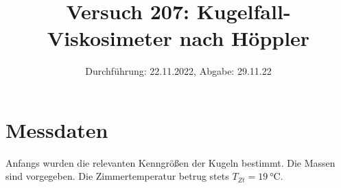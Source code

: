 

\title{Versuch 207: Kugelfall-Viskosimeter nach Höppler}
\date{Durchführung: 22.11.2022, Abgabe: 29.11.22}



\maketitle

\tableofcontents
\newpage












\section{Messdaten}

Anfangs wurden die relevanten Kenngrößen der Kugeln bestimmt.
Die Massen sind vorgegeben.
Die Zimmertemperatur betrug stets $T_{Zt}=\qty[]{19}{\degreeCelsius}$.



